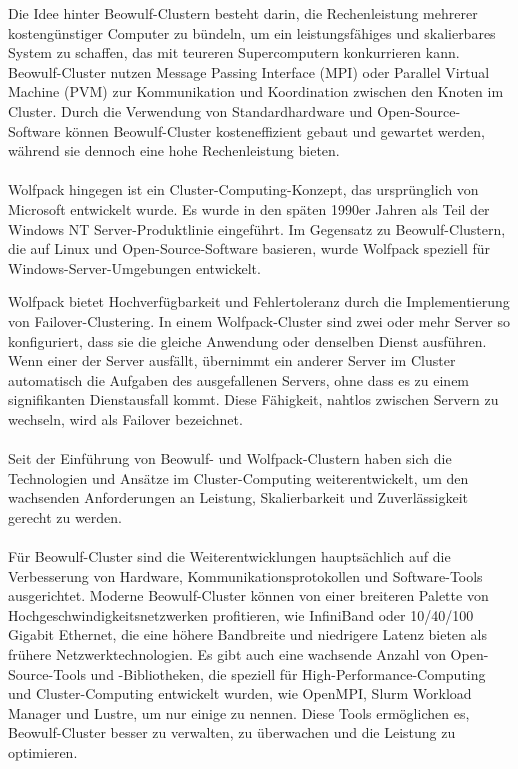 \documentclass[../vs-script-first-v01.tex]{subfiles}
\begin{document}
Die Idee hinter Beowulf-Clustern besteht darin, die Rechenleistung mehrerer kostengünstiger Computer zu bündeln, um ein leistungsfähiges und skalierbares System zu schaffen, das mit teureren Supercomputern konkurrieren kann. Beowulf-Cluster nutzen Message Passing Interface (MPI) oder Parallel Virtual Machine (PVM) zur Kommunikation und Koordination zwischen den Knoten im Cluster. Durch die Verwendung von Standardhardware und Open-Source-Software können Beowulf-Cluster kosteneffizient gebaut und gewartet werden, während sie dennoch eine hohe Rechenleistung bieten.
\\\\
Wolfpack hingegen ist ein Cluster-Computing-Konzept, das ursprünglich von Microsoft entwickelt wurde. Es wurde in den späten 1990er Jahren als Teil der Windows NT Server-Produktlinie eingeführt. Im Gegensatz zu Beowulf-Clustern, die auf Linux und Open-Source-Software basieren, wurde Wolfpack speziell für Windows-Server-Umgebungen entwickelt.

Wolfpack bietet Hochverfügbarkeit und Fehlertoleranz durch die Implementierung von Failover-Clustering. In einem Wolfpack-Cluster sind zwei oder mehr Server so konfiguriert, dass sie die gleiche Anwendung oder denselben Dienst ausführen. Wenn einer der Server ausfällt, übernimmt ein anderer Server im Cluster automatisch die Aufgaben des ausgefallenen Servers, ohne dass es zu einem signifikanten Dienstausfall kommt. Diese Fähigkeit, nahtlos zwischen Servern zu wechseln, wird als Failover bezeichnet.
\\\\
Seit der Einführung von Beowulf- und Wolfpack-Clustern haben sich die Technologien und Ansätze im Cluster-Computing weiterentwickelt, um den wachsenden Anforderungen an Leistung, Skalierbarkeit und Zuverlässigkeit gerecht zu werden.
\\\\
Für Beowulf-Cluster sind die Weiterentwicklungen hauptsächlich auf die Verbesserung von Hardware, Kommunikationsprotokollen und Software-Tools ausgerichtet. Moderne Beowulf-Cluster können von einer breiteren Palette von Hochgeschwindigkeitsnetzwerken profitieren, wie InfiniBand oder 10/40/100 Gigabit Ethernet, die eine höhere Bandbreite und niedrigere Latenz bieten als frühere Netzwerktechnologien. Es gibt auch eine wachsende Anzahl von Open-Source-Tools und -Bibliotheken, die speziell für High-Performance-Computing und Cluster-Computing entwickelt wurden, wie OpenMPI, Slurm Workload Manager und Lustre, um nur einige zu nennen. Diese Tools ermöglichen es, Beowulf-Cluster besser zu verwalten, zu überwachen und die Leistung zu optimieren.
\end{document}
